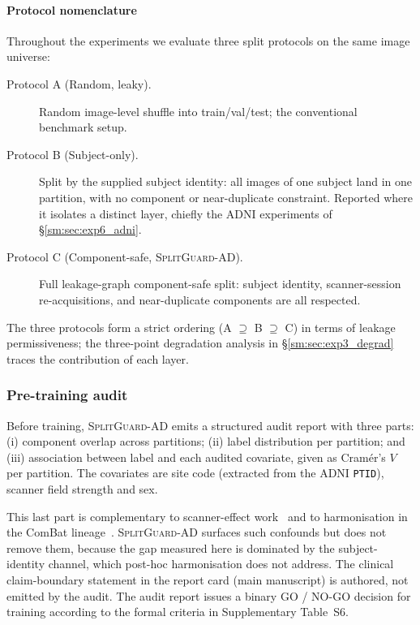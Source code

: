 \documentclass[11pt]{article}
\newcommand{\SGA}{\textsc{SplitGuard-AD}}
\begin{document}
\paragraph{Protocol nomenclature}
Throughout the experiments we evaluate three split protocols on the
same image universe:
\begin{description}
  \item[Protocol A (Random, leaky).] Random image-level shuffle into
        train/val/test; the conventional benchmark setup.
  \item[Protocol B (Subject-only).] Split by the supplied subject
        identity: all images of one subject land in one partition, with
        no component or near-duplicate constraint. Reported where it
        isolates a distinct layer, chiefly the ADNI experiments of
        \S\ref{sm:sec:exp6_adni}.
  \item[Protocol C (Component-safe, \SGA{}).] Full leakage-graph
        component-safe split: subject identity, scanner-session
        re-acquisitions, and near-duplicate components are all
        respected.
\end{description}
The three protocols form a strict ordering (A $\supseteq$ B $\supseteq$ C)
in terms of leakage permissiveness; the three-point degradation analysis
in \S\ref{sm:sec:exp3_degrad} traces the contribution of each layer.

\subsubsection{Pre-training audit}
Before training, \SGA{} emits a structured audit report with three parts:
(i) component overlap across partitions; (ii) label distribution per
partition; and (iii) association between label and each audited covariate,
given as Cram\'{e}r's $V$ per partition. The covariates are site code
(extracted from the ADNI \texttt{PTID}), scanner field strength and sex.

This last part is complementary to scanner-effect work~\cite{glocker2019scanner}
and to harmonisation in the ComBat
lineage~\cite{johnson2007combat,fortin2017combat,pomponio2020lifespan}.
\SGA{} surfaces such confounds but does not remove them, because the gap
measured here is dominated by the subject-identity channel, which
post-hoc harmonisation does not address. The clinical claim-boundary
statement in the report card (main manuscript) is authored, not
emitted by the audit.
The audit report issues a binary GO / NO-GO decision for training
according to the formal criteria in Supplementary Table~S6.
\end{document}
